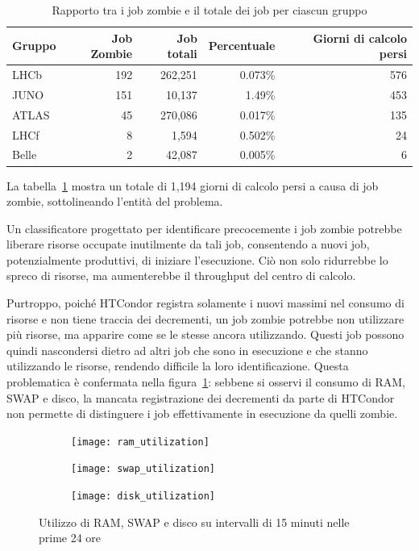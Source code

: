 \begin{table}[!ht]
    \centering
    \caption{Rapporto tra i job zombie e il totale dei job per ciascun gruppo}
    \begin{tabular}{lrrrr}
        \toprule
        \textbf{Gruppo} & \textbf{Job Zombie} & \textbf{Job totali} &
        \textbf{Percentuale} & \textbf{Giorni di calcolo persi} \\
        \midrule
        LHCb & 192 & 262,251 & 0.073\% & 576 \\
        JUNO & 151 & 10,137 & 1.49\% & 453 \\
        ATLAS & 45 & 270,086 & 0.017\% & 135 \\
        LHCf & 8 & 1,594 & 0.502\% & 24 \\
        Belle & 2 & 42,087 & 0.005\% & 6 \\
        \bottomrule
    \end{tabular}
    \label{table:job_zombie_timelost}
\end{table}

La tabella~\ref{table:job_zombie_timelost} mostra un totale di 1,194 giorni di
calcolo persi a causa di job zombie, sottolineando l'entità del problema.
    
Un classificatore progettato per identificare precocemente i job zombie
potrebbe liberare risorse occupate inutilmente da tali job, consentendo a
nuovi job, potenzialmente produttivi, di iniziare l'esecuzione. Ciò non solo
ridurrebbe lo spreco di risorse, ma aumenterebbe il throughput del centro di
calcolo.

Purtroppo, poiché HTCondor registra solamente i nuovi massimi nel consumo di
risorse e non tiene traccia dei decrementi, un job zombie potrebbe non
utilizzare più risorse, ma apparire come se le stesse ancora utilizzando.
Questi job possono quindi nascondersi dietro ad altri job che sono in
esecuzione e che stanno utilizzando le risorse, rendendo difficile la loro
identificazione. Questa problematica è confermata nella
figura~\ref{fig:resources_utilization_firstday}: sebbene si osservi il consumo
di RAM, SWAP e disco, la mancata registrazione dei decrementi da parte di
HTCondor non permette di distinguere i job effettivamente in esecuzione da
quelli zombie.

\begin{figure}[p]
    \centering
    \begin{subfigure}[t]{0.8\linewidth}
        \texttt{[image: ram\_utilization]}
    \end{subfigure}
    \vfill
    \begin{subfigure}[t]{0.8\linewidth}
        \texttt{[image: swap\_utilization]}
    \end{subfigure}
    \vfill
    \begin{subfigure}[t]{0.8\linewidth}
        \texttt{[image: disk\_utilization]}
    \end{subfigure}
    \caption{Utilizzo di RAM, SWAP e disco su intervalli di 15 minuti nelle
    prime 24 ore}
    \label{fig:resources_utilization_firstday}
\end{figure}

